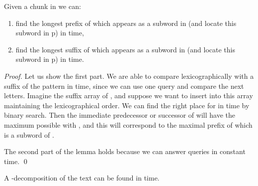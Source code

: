 \documentclass[runningheads]{llncs}
\begin{document}
\begin{lemma}\label{lemma:longfactor}
Given a chunk  in  we can:
\begin{enumerate}
\item{find the longest prefix of  which appears as a subword in  (and locate this subword in p) in } time,
\item{find the longest suffix of  which appears as a subword in  (and locate this subword in p) in } time.
\end{enumerate}
\end{lemma}

\begin{proof}
Let us show the first part. We are able to compare lexicographically  with a suffix of the pattern in  time, since we can use one  query and compare the next letters. Imagine the suffix array of , and suppose we want to insert  into this array maintaining the lexicographical order. We can find the right place for  in  time by binary search. Then the immediate predecessor or successor of  will have the maximum possible  with , and this will correspond to the maximal prefix of  which is a subword of . 

The second part of the lemma holds because we can answer  queries in constant time.
\qed
\end{proof}

\begin{lemma}
A -decomposition of the text can be found in  time.
\end{lemma}
\end{document}
